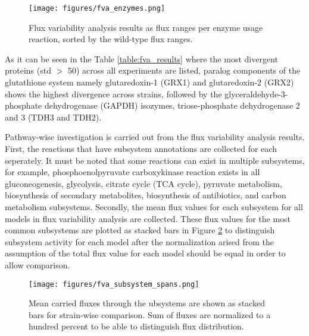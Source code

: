 \begin{figure}[H]
  \begin{center}
  \texttt{[image: figures/fva\_enzymes.png]}
  \caption[Flux variability analysis results as flux ranges per enzyme usage reaction, sorted by the wild-type flux ranges]{Flux variability analysis results as flux ranges per enzyme usage reaction, sorted by the wild-type flux ranges.}
  \end{center}
  \label{fig:fva_enzymes}
  \end{figure}

As it can be seen in the Table \ref{table:fva_results} where the most divergent proteins (std $>$ 50) across all experiments are listed, paralog components of the glutathione system namely glutaredoxin-1 (GRX1) and glutaredoxin-2 (GRX2) shows the highest divergence across strains, followed by the glyceraldehyde-3-phosphate dehydrogenase (GAPDH) isozymes, triose-phosphate dehydrogenase 2 and 3 (TDH3 and TDH2).



Pathway-wise investigation is carried out from the flux variability analysis results. First, the reactions that have subsystem annotations are collected for each seperately. It must be noted that some reactions can exist in multiple subsystems, for example, phosphoenolpyruvate carboxykinase reaction exists in all gluconeogenesis, glycolysis, citrate cycle (TCA cycle), pyruvate metabolism, biosynthesis of secondary metabolites, biosynthesis of antibiotics, and carbon metabolism subsystems. Secondly, the mean flux values for each subsystem for all models in flux variability analysis are collected. These flux values for the most common subsystems are plotted as stacked bars in Figure \ref{fig:fva_subsystem_spans} to distinguish subsystem activity for each model after the normalization arised from the assumption of the total flux value for each model should be equal in order to allow comparison.

\begin{figure}[H]
  \begin{center}
  \texttt{[image: figures/fva\_subsystem\_spans.png]}
  \caption[Mean carried fluxes through the ubsystems are shown as stacked bars for strain-wise comparison. Sum of fluxes are normalized to a hundred percent to be able to distinguish flux distribution]{Mean carried fluxes through the ubsystems are shown as stacked bars for strain-wise comparison. Sum of fluxes are normalized to a hundred percent to be able to distinguish flux distribution.}
  \label{fig:fva_subsystem_spans}
  \end{center}
\end{figure}

